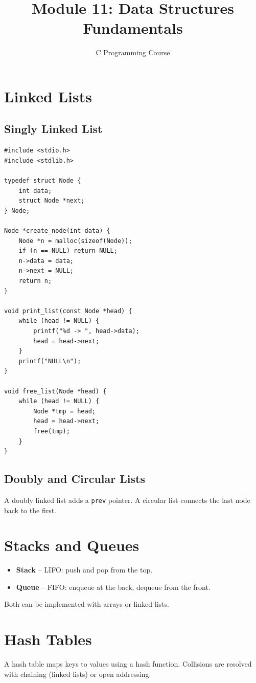 \documentclass[11pt,a4paper]{article}
\title{Module 11: Data Structures Fundamentals}
\author{C Programming Course}
\date{}
\begin{document}
\maketitle
\thispagestyle{fancy}

\section{Linked Lists}
\subsection{Singly Linked List}
\begin{lstlisting}
#include <stdio.h>
#include <stdlib.h>

typedef struct Node {
    int data;
    struct Node *next;
} Node;

Node *create_node(int data) {
    Node *n = malloc(sizeof(Node));
    if (n == NULL) return NULL;
    n->data = data;
    n->next = NULL;
    return n;
}

void print_list(const Node *head) {
    while (head != NULL) {
        printf("%d -> ", head->data);
        head = head->next;
    }
    printf("NULL\n");
}

void free_list(Node *head) {
    while (head != NULL) {
        Node *tmp = head;
        head = head->next;
        free(tmp);
    }
}
\end{lstlisting}

\subsection{Doubly and Circular Lists}
A doubly linked list adds a \texttt{prev} pointer. A circular list connects the
last node back to the first.

\section{Stacks and Queues}
\begin{itemize}
  \item \textbf{Stack} -- LIFO: push and pop from the top.
  \item \textbf{Queue} -- FIFO: enqueue at the back, dequeue from the front.
\end{itemize}

Both can be implemented with arrays or linked lists.

\section{Hash Tables}
A hash table maps keys to values using a hash function. Collisions are resolved
with chaining (linked lists) or open addressing.
\end{document}
